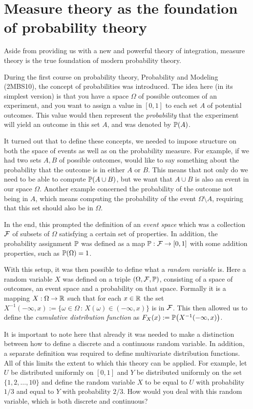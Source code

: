 \section{Measure theory as the foundation of probability theory}

Aside from providing us with a new and powerful theory of integration, measure theory is the true foundation of modern probability theory. 

During the first course on probability theory, Probability and Modeling (2MBS10), the concept of probabilities was introduced. The idea here (in its simplest version) is that you have a space $\Omega$ of possible outcomes of an experiment, and you want to assign a value in $[0,1]$ to each set $A$ of potential outcomes. This value would then represent the \emph{probability} that the experiment will yield an outcome in this set $A$, and was denoted by $\mathbb P\!\left(A\right)$. 

It turned out that to define these concepts, we needed to impose structure on both the space of events as well as on the probability measure. For example, if we had two sets $A, B$ of possible outcomes, would like to say something about the probability that the outcome is in either $A$ or $B$. This means that not only do we need to be able to compute $\mathbb P\!\left(A \cup B\right)$, but we want that $A \cup B$ is also an event in our space $\Omega$. Another example concerned the probability of the outcome not being in $A$, which means computing the probability of the event $\Omega\setminus A$, requiring that this set should also be in $\Omega$. 

In the end, this prompted the definition of an \emph{event space} which was a collection $\mathcal F$ of subsets of $\Omega$ satisfying a certain set of properties. In addition, the probability assignment $\mathbb P$ was defined as a map $\mathbb P : \mathcal F \to [0,1]$ with some addition properties, such as $\mathbb P\!\left(\Omega\right) = 1$.


With this setup, it was then possible to define what a \emph{random variable} is. Here a random variable $X$ was defined on a triple $(\Omega, \mathcal F, \mathbb P)$, consisting of a space of outcomes, an event space and a probability on that space. Formally it is a mapping $X : \Omega \to \mathbb R$ such that for each $x \in \mathbb R$ the set $X^{-1}(-\infty,x):=\{\omega \in \Omega \, : \, X(\omega) \in (-\infty,x)\}$ is in $\mathcal F$. This then allowed us to define the \emph{cumulative distribution function} as $F_X(x) := \mathbb P\!\left(X^{-1}(-\infty,x)\right)$.

It is important to note here that already it was needed to make a distinction between how to define a discrete and a continuous random variable. In addition, a separate definition was required to define multivariate distribution functions. All of this limits the extent to which this theory can be applied. For example, let $U$ be distributed uniformly on $[0,1]$ and $Y$ be distributed uniformly on the set $\{1,2, \dots, 10\}$ and define the random variable $X$ to be equal to $U$ with probability $1/3$ and equal to $Y$ with probability $2/3$. How would you deal with this random variable, which is both discrete and continuous? 


